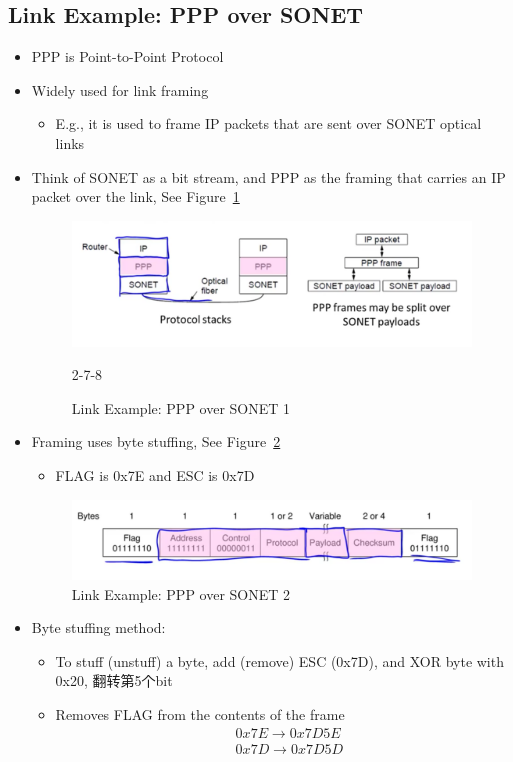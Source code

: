 \documentclass[12pt]{ctexart}   %
\begin{document}
	\subsection{Link Example: PPP over SONET}
	\begin{itemize}
		\item PPP is Point-to-Point Protocol
		\item Widely used for link framing
		\begin{itemize}
			\item E.g., it is used to frame IP packets that are sent over SONET optical links
		\end{itemize}
		
		\item Think of SONET as a bit stream, and PPP as the framing that  carries an IP packet over the link, See Figure~\ref{fig:2-7-7}
		\begin{figure}[h!] %
		\centering
		 \includegraphics[scale=0.7]{images/2-7-7}
		\caption{Link Example: PPP over SONET 1}2-7-8
		 \label{fig:2-7-7}
		 \end{figure}
		 
		 \item Framing uses byte stuffing, See Figure~\ref{fig:2-7-8}
		 \begin{itemize}
		 	\item FLAG is 0x7E and ESC is 0x7D
		 \end{itemize}
		 
		 \begin{figure}[h!] %
		\centering
		 \includegraphics[scale=0.7]{images/2-7-8}
		\caption{Link Example: PPP over SONET 2}
		 \label{fig:2-7-8}
		 \end{figure}		 
		 
		 \item Byte stuffing method:
		 \begin{itemize}
		 	\item To stuff (unstuff) a byte, add (remove) ESC (0x7D), and XOR byte with 0x20, {\color{red} 翻转第5个bit}
		 	\item Removes FLAG from the contents of the frame
		 	\begin{equation}
			\begin{aligned}
			& 0x7E \rightarrow 0x7D5E \\
			& 0x7D \rightarrow 0x7D5D 
			\end{aligned}
			\end{equation}
		 \end{itemize}
		

\end{itemize}
\end{document}
